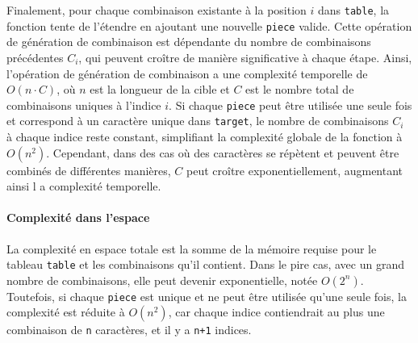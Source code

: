\documentclass[9pt]{report}
\begin{document}
\begin{multicols*}{2}
  Finalement, pour chaque combinaison existante à la position $i$ dans \texttt{table}, 
  la fonction tente de l'étendre en ajoutant une nouvelle \texttt{piece} valide. 
  Cette opération de génération de combinaison est dépendante du nombre de
  combinaisons précédentes $C_i$, qui peuvent croître de manière significative 
  à chaque étape. Ainsi, l'opération de génération de combinaison a une 
  complexité temporelle de $O(n \cdot C)$, où $n$ est la longueur de la 
  cible et $C$ est le nombre total de combinaisons uniques à l'indice $i$. 
  Si chaque \texttt{piece} peut être utilisée une seule fois et correspond 
  à un caractère unique dans \texttt{target}, le nombre de combinaisons $C_i$ 
  à chaque indice reste constant, simplifiant la complexité globale de la fonction à $O(n^2)$.
  Cependant, dans des cas où des caractères se répètent et peuvent être combinés de
  différentes manières, $C$ peut croître exponentiellement, augmentant ainsi l
  a complexité temporelle.


  \paragraph{Complexité dans l'espace}
  La complexité en espace totale est la somme de la mémoire requise pour le tableau 
  \texttt{table} et les combinaisons qu'il contient. Dans le pire cas, avec un grand nombre de 
  combinaisons, elle peut devenir exponentielle, notée \( O(2^n) \). Toutefois, si chaque 
  \texttt{piece} est unique et ne peut être utilisée qu'une seule fois, la complexité est 
  réduite à \( O(n^2) \), car chaque indice contiendrait au plus une combinaison de \texttt{n} 
  caractères, et il y a \texttt{n+1} indices.















\end{multicols*}
\end{document}
